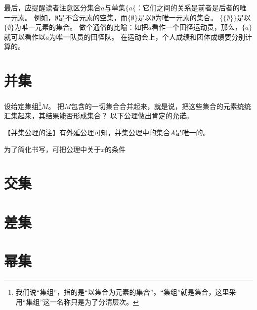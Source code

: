 最后，应提醒读者注意区分集合$a$与单集$\{a\{$：它们之间的关系是前者是后者的唯一元素。
例如，$\emptyset$是不含元素的空集，而$\{\emptyset\}$是以$\emptyset$为唯一元素的集合。
$\{\{\emptyset\}\}$是以$\{\emptyset\}$为唯一元素的集合。
做个通俗的比喻：如把$a$看作一个田径运动员，那么，$\{a\}$就可以看作以$a$为唯一队员的田径队。
在运动会上，个人成绩和团体成绩要分别计算的。

\section{并集}

设给定集组\footnote{我们说“集组”，指的是“以集合为元素的集合”。“集组”就是集合，这里采用“集组”这一名称只是为了分清层次。}$M$。
把$M$包含的一切集合合并起来，就是说，把这些集合的元素统统汇集起来，其结果能否形成集合？
以下公理做出肯定的允诺。


【并集公理的注】有外延公理可知，并集公理中的集合$A$是唯一的。

为了简化书写，可把公理中关于$x$的条件

\section{交集}

\section{差集}

\section{幂集}
